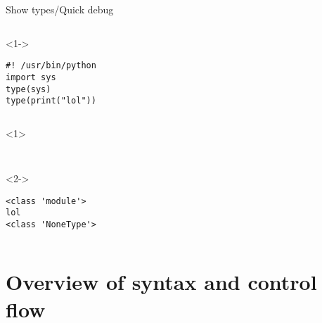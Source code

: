 \begin{frame}[fragile]{Show types/Quick debug}

  \begin{columns}[onlytextwidth]
    \begin{column}{\textwidth}
      \begin{onlyenv}<1->
        \begin{lstlisting}[style=python,title={types2.py}]
#! /usr/bin/python
import sys
type(sys)
type(print("lol")) \end{lstlisting}
      \end{onlyenv}
    \end{column}
  \end{columns}

    \begin{columns}[onlytextwidth]
    \begin{column}{\textwidth}
      \begin{onlyenv}<1>
        \begin{lstlisting}[style=sh]
%*\LSTPrompt*) python types2.py


        \end{lstlisting}
      \end{onlyenv}

      \begin{onlyenv}<2->
        \begin{lstlisting}[style=sh]
%*\LSTPrompt*) python types2.py
<class 'module'>
lol
<class 'NoneType'> \end{lstlisting}
      \end{onlyenv}
    \end{column}
  \end{columns}
\end{frame}


\section{Overview of syntax and control flow}


